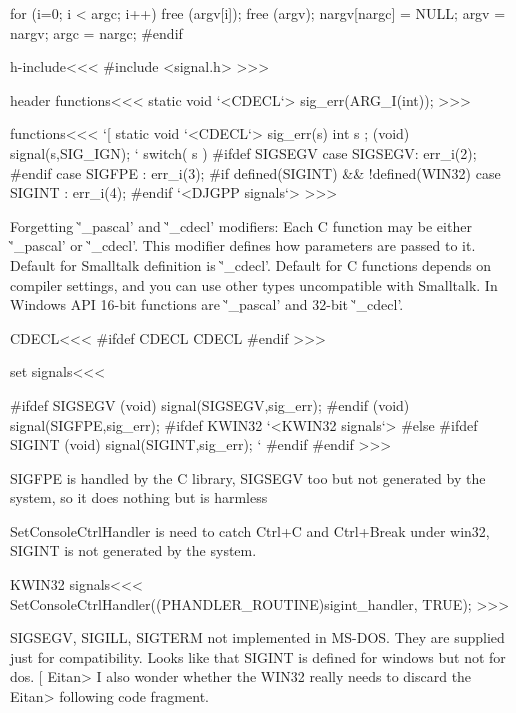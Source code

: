 {{{{{{{{    for (i=0; i < argc; i++)
      free (argv[i]);
    free (argv);
    nargv[nargc] = NULL;
    argv = nargv;
    argc = nargc;
  }
#endif





\<h-include\><<<
#include <signal.h>
>>>

\<header functions\><<<
static void 
`<CDECL`>
sig_err(ARG_I(int));
>>>




\<functions\><<<
`[
static void
`<CDECL`>
sig_err(s)  int s
;{
  (void) signal(s,SIG_IGN);  `%
  switch( s ){
#ifdef SIGSEGV
    case SIGSEGV: err_i(2); 
#endif
    case SIGFPE : err_i(3);  
#if defined(SIGINT) && !defined(WIN32)
    case SIGINT : err_i(4);
#endif
  } 
  `<DJGPP signals`>
}
>>>




Forgetting \`'_pascal' and \`'_cdecl' modifiers: Each C function may
be either \`'_pascal' or \`'_cdecl'. This modifier defines how
parameters are passed to it. Default for Smalltalk definition is
\`'_cdecl'. Default for C functions depends on compiler settings, and
you can use other types uncompatible with Smalltalk. In Windows API
16-bit functions are \`'_pascal' and 32-bit \`'_cdecl'.
 


\<CDECL\><<< 
#ifdef CDECL
CDECL
#endif
>>>
 



\<set signals\><<<

#ifdef SIGSEGV
  (void) signal(SIGSEGV,sig_err);
#endif
  (void) signal(SIGFPE,sig_err);
#ifdef KWIN32
  `<KWIN32 signals`>
#else 
#ifdef SIGINT
  (void) signal(SIGINT,sig_err);    `%
#endif
#endif
>>>



SIGFPE is handled by the C library, SIGSEGV too but not generated by
the system, so it does nothing but is harmless 

SetConsoleCtrlHandler is need to catch Ctrl+C and Ctrl+Break under
win32, SIGINT is not generated by the system.
 
\<KWIN32 signals\><<<
SetConsoleCtrlHandler((PHANDLER_ROUTINE)sigint_handler, TRUE);
>>>



SIGSEGV, SIGILL, SIGTERM not implemented in MS-DOS. They are supplied just for
compatibility. Looks like that SIGINT is defined for windows but not for dos.
\ifHtml[\Verbatim
    Eitan> I also wonder whether the WIN32 really needs to discard the
    Eitan> following code fragment.

}}}}}}}
